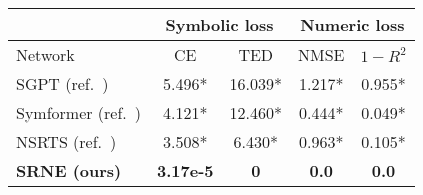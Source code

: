 \begin{tabular}{| l || c | c | c | c | } \hline

        & \multicolumn{2}{c|}{Symbolic loss} & \multicolumn{2}{c|}{Numeric loss} \\\hline        
Network & CE & TED & NMSE &$1-R^2$  \\ \hline \hline

SGPT  (ref.~\cite{Valipour2021})   & 5.496* & 16.039* & 1.217* & 0.955*     \\ \hline
Symformer (ref.~\cite{Vastl2022}) & 4.121* & 12.460* & 0.444* & 0.049*     \\ \hline
NSRTS (ref.~\cite{Biggio2021})   &  3.508* & 6.430* & 0.963* & 0.105*     \\ \hline
\textbf{SRNE (ours)}                     & \textbf{3.17e-5} & \textbf{0} & \textbf{0.0} & \textbf{0.0}    \\ \hline
\end{tabular}